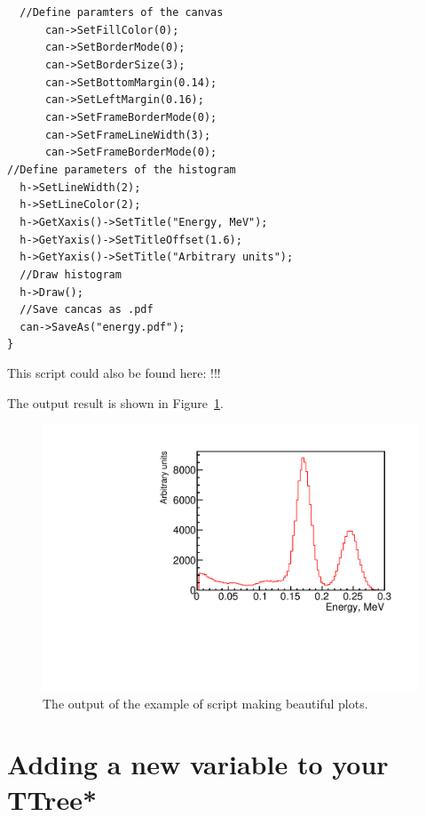 \documentclass[12pt]{article}
\begin{document}
\verb|	//Define paramters of the canvas|\\
\verb|	    can->SetFillColor(0);|\\
\verb|	    can->SetBorderMode(0);|\\
\verb|	    can->SetBorderSize(3);|\\
\verb|	    can->SetBottomMargin(0.14);|\\
\verb|	    can->SetLeftMargin(0.16);|\\
\verb|	    can->SetFrameBorderMode(0);|\\
\verb|	    can->SetFrameLineWidth(3);|\\
\verb|	    can->SetFrameBorderMode(0);|\\

\verb|//Define parameters of the histogram|\\
\verb|  h->SetLineWidth(2);|\\
\verb|  h->SetLineColor(2);|\\
\verb|  h->GetXaxis()->SetTitle("Energy, MeV");|\\
\verb|  h->GetYaxis()->SetTitleOffset(1.6);|\\ 
\verb|  h->GetYaxis()->SetTitle("Arbitrary units"); |\\  
\verb|	//Draw histogram|\\
\verb|  h->Draw();|\\
\verb|  //Save cancas as .pdf|\\
\verb|  can->SaveAs("energy.pdf");|\\
\verb|}|

This script could also be found here: !!!

The output result is shown in Figure~\ref{fig:energy}.

\begin{figure}[h]
\centering
\includegraphics[scale=0.6]{figs/energy.pdf}
\caption{The output of the example of script making beautiful plots.}
\label{fig:energy}
\end{figure}


\clearpage
\section{Adding a new variable to your TTree*}







%
%
\end{document}
